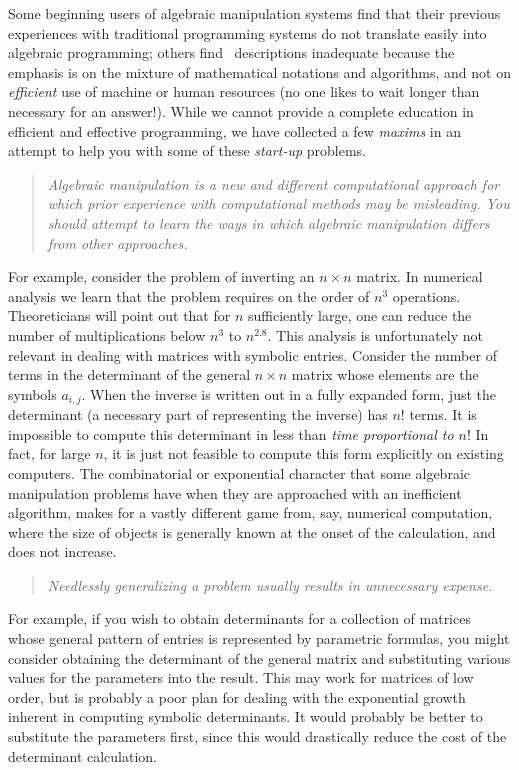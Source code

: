 \label{maxims}

Some beginning users of algebraic manipulation systems
find that their
previous experiences with traditional programming systems do
not translate easily into algebraic programming; others find
\Max\
descriptions inadequate because the emphasis is on
the mixture of mathematical notations and algorithms, and not on 
{\it efficient} use of machine or human resources (no one likes to wait
longer than necessary for an answer!).
While we cannot provide a complete education in efficient and effective
programming,
we have collected a few
{\it maxims} in an attempt to help you with some of these {\it start-up}
problems.

\begin{quote}
{\it Algebraic manipulation is a new and different
computational approach for which prior experience with
computational methods may be misleading.
You should attempt to learn the ways in which algebraic
manipulation differs from other approaches.}
\end{quote}


For
example, consider the problem of inverting an $n \times n$
matrix.  In numerical analysis we learn that the problem
requires on the order of $n^3$ operations.  Theoreticians
will point out that for $n$ sufficiently large, one can
reduce the number of multiplications below $ n^3$ to $n^{2.8}$.
This analysis is unfortunately not relevant in dealing with matrices
with symbolic entries.  Consider the number of terms in
the determinant of the general $n \times n$ matrix whose elements
are the symbols $ a_{i,j} $.  When the inverse is written out
in a fully expanded form, just the
determinant (a necessary part of representing
the inverse) has $n !$
terms. It is impossible to compute this determinant in less than {\it time
proportional to $n !$}  In fact,
for large $n$, it is just not feasible
to compute this form explicitly on existing computers.
The combinatorial
or exponential character that some algebraic manipulation
problems have when they are approached with an inefficient algorithm, makes for a vastly
different game from, say, numerical computation, where the size of objects
is generally known at the onset of the calculation, and does not increase.

\begin{quote}
{\it Needlessly generalizing a problem usually results in unnecessary expense.}
\end{quote}

For example, if you wish to obtain determinants
for a collection of matrices whose general
pattern of entries is represented by parametric formulas,
you might consider obtaining the determinant
of the general matrix and substituting various values for the parameters
into the 
result.  This may work for matrices of low order, but
is probably a poor plan for dealing with the exponential
growth inherent in computing symbolic determinants. It would probably
be better to substitute the parameters first, since this would
drastically reduce the cost of the determinant calculation.

